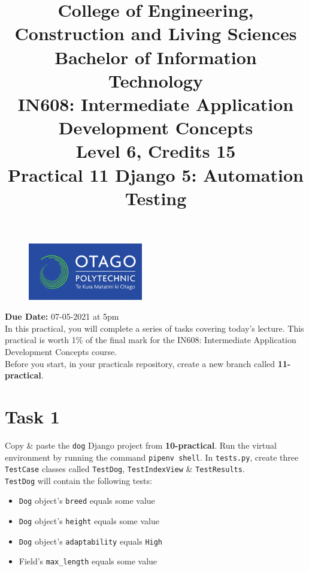 \documentclass{article}
\author{}
\begin{document}
\begin{figure}
	\centering
	\includegraphics[width=50mm]{./img/logo.png}
\end{figure}

\title{College of Engineering, Construction and Living Sciences\\Bachelor of Information Technology\\IN608: Intermediate Application Development Concepts\\Level 6, Credits 15\\\textbf{Practical 11 Django 5: Automation Testing}} 
\date{}
\maketitle

\textbf{Due Date:} 07-05-2021 at 5pm \\

In this practical, you will complete a series of tasks covering today's lecture. This practical is worth 1\% of the final mark for the IN608: Intermediate Application Development Concepts course. \\

Before you start, in your practicals repository, create a new branch called \textbf{11-practical}.

\section*{Task 1} 
Copy \& paste the \texttt{dog} Django project from \textbf{10-practical}. Run the virtual environment by running the command \texttt{pipenv shell}. In \texttt{tests.py}, create three \texttt{TestCase} classes called \texttt{TestDog}, \texttt{TestIndexView} \& \texttt{TestResults}.  \\

\texttt{TestDog} will contain the following tests:
\begin{itemize}
  \item \texttt{Dog} object's \texttt{breed} equals some value
  \item \texttt{Dog} object's \texttt{height} equals some value
  \item \texttt{Dog} object's \texttt{adaptability} equals \texttt{High}
  \item Field's \texttt{max\_length} equals some value
\end{itemize}
\end{document}
